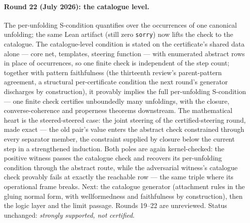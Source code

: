 \documentclass[
]{ceurart}
\theoremstyle{definition}
\begin{document}
\paragraph{Round 22 (July 2026): the catalogue level.}
The per-unfolding S-condition quantifies over the occurrences of one
canonical unfolding; the same Lean artifact (still zero
\texttt{sorry}) now lifts the check to the catalogue.  The
catalogue-level condition is stated on the certificate's shared data
alone --- core net, templates, steering function --- with enumerated
abstract rows in place of occurrences, so one finite check is
independent of the step count; together with pattern faithfulness
(the thirteenth review's parent-pattern agreement, a structural
per-certificate condition the next round's generator discharges by
construction), it provably implies the full per-unfolding S-condition
--- one finite check certifies unboundedly many unfoldings, with the
closure, converse-coherence and properness theorems downstream.  The
mathematical heart is the steered-steered case: the joint steering of
the certified-steering round, made exact --- the old pair's value
enters the abstract check constrained through every separator member,
the constraint supplied by closure below the current step in a
strengthened induction.  Both poles are again kernel-checked: the
positive witness passes the catalogue check and recovers its
per-unfolding condition through the abstract route, while the
adversarial witness's catalogue check provably fails at exactly the
reachable row --- the same triple where its operational frame breaks.
Next: the catalogue generator (attachment rules in the gluing normal
form, with wellformedness and faithfulness by construction), then the
logic layer and the limit passage.  Rounds 19--22 are unreviewed.
Status unchanged: \emph{strongly supported, not certified}.
\end{document}
